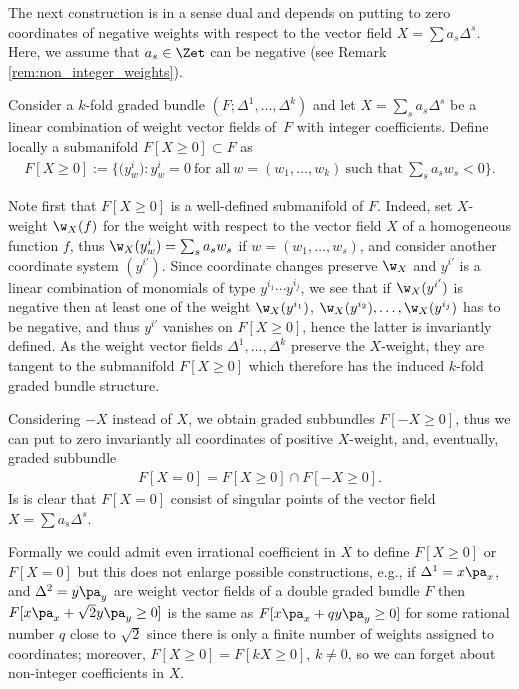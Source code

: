 The next construction is in a sense dual and depends on putting to zero coordinates of negative weights with respect to the vector f\/ield $X=\sum a_s \Delta^s$. Here, we assume that $a_s\in \Zet$ can be negative (see Remark \ref{rem:non_integer_weights}).
\begin{Definition}\label{def:removal_coordinates2} Consider a $k$-fold graded bundle $(F; \Delta^1, \ldots, \Delta^k)$ and let $X=\sum_s a_s \Delta^s$ be a linear combination of weight vector f\/ields of~$F$ with integer coef\/f\/icients. Def\/ine locally a submanifold $F[X\geq 0] \subset F$ as
\begin{gather*}
 F[X\geq 0]:= \bigg\{\big(y^i_w\big)\colon y^i_w=0 \  \text{for all} \  w=(w_1, \ldots, w_k)\  \text{such that}\  \sum_s a_s w_s < 0\bigg\}.
\end{gather*}
\end{Definition}

Note f\/irst that $F[X\geq 0]$ is a well-def\/ined submanifold of $F$. Indeed, set $X$-weight $\w_X(f)$ for the weight with respect to the vector f\/ield $X$ of a homogeneous function $f$, thus $\w_X(y^i_w) = \sum_s a_s w_s$ if $w=(w_1, \ldots, w_s)$, and consider another coordinate system $(y^{i'})$. Since coordinate changes preserve $\w_X$ and $y^{i'}$ is a linear combination of monomials of type $y^{i_1}\cdots y^{i_j}$, we see that if $\w_X(y^{i'})$ is negative then at least one of the weight $\w_X(y^{i_1})$, $\w_X(y^{i_2}), \ldots, \w_X(y^{i_j})$ has to be negative, and thus $y^{i'}$ vanishes on $F[X\geq 0]$, hence the latter is invariantly def\/ined. As the weight vector f\/ields $\Delta^1, \ldots, \Delta^k$ preserve the $X$-weight, they are tangent to the submanifold $F[X\geq 0]$ which therefore has the induced $k$-fold graded bundle structure.

Considering $-X$ instead of $X$, we obtain graded subbundles $F[-X\ge 0]$, thus we can put to zero invariantly all coordinates of positive $X$-weight, and, eventually, graded subbundle \begin{gather*}
F[X=0] = F[X\geq 0] \cap F[-X\geq 0].
\end{gather*}
Is is clear that $F[X=0]$ consist of singular points of the vector f\/ield $X = \sum a_s \Delta^s$.

\begin{Remark}\label{rem:non_integer_weights} Formally we could admit even irrational coef\/f\/icient in $X$ to def\/ine $F[X\geq 0]$ or $F[X=0]$ but this does not enlarge possible constructions, e.g., if $\Delta^1 = x \pa_x$, and $\Delta^2 = y\pa_y$ are weight vector f\/ields of a double graded bundle $F$ then $F[x\pa_x + \sqrt{2} y \pa_y\geq 0]$ is the same as $F[x\pa_x + q y \pa_y\geq 0]$ for some rational number $q$ close to $\sqrt{2}$ since there is only a f\/inite number of weights assigned to coordinates; moreover, $F[X\geq 0] = F[k X\geq 0]$, $k\neq 0$, so we can forget about non-integer coef\/f\/icients in $X$.
\end{Remark}


